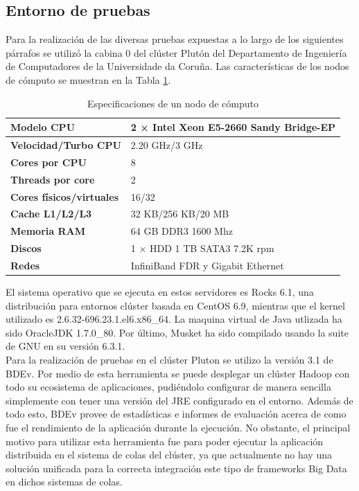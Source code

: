 \documentclass[conference]{IEEEtran}
\begin{document}
\subsection{Entorno de pruebas}
Para la realización de las diversas pruebas expuestas a lo largo de los siguientes párrafos se utilizó la cabina 0 del clúster Plutón\cite{pluton} del Departamento de Ingeniería de Computadores de la Universidade da Coruña. Las características de los nodos de cómputo se muestran en la Tabla \ref{node_especification}.\\ 

\begin{table}[t]
	\begin{center}
		\begin{tabular}{|l|l|}
			\hline
			\textbf{Modelo CPU} & 2 × Intel Xeon E5-2660 Sandy Bridge-EP \\ \hline
			\textbf{Velocidad/Turbo CPU} & 2.20 GHz/3 GHz \\ \hline
			\textbf{Cores por CPU} & 8 \\ \hline
			\textbf{Threads por core} & 2 \\ \hline
			\textbf{Cores físicos/virtuales} & 16/32 \\ \hline
			\textbf{Cache L1/L2/L3} & 32 KB/256 KB/20 MB \\ \hline
			\textbf{Memoria RAM} & 64 GB DDR3 1600 Mhz \\ \hline
			\textbf{Discos} & 1 × HDD 1 TB SATA3 7.2K rpm\\ \hline
			\textbf{Redes} & InfiniBand FDR y Gigabit Ethernet \\ \hline
		\end{tabular}
		\caption{Especificaciones de un nodo de cómputo}
		\label{node_especification}
	\end{center}
\end{table}

El sistema operativo que se ejecuta en estos servidores es Rocks 6.1, una distribución para entornos clúster basada en CentOS 6.9, mientras que el kernel utilizado es 2.6.32-696.23.1.el6.x86\_64. La maquina virtual de Java utlizada ha sido OracleJDK 1.7.0\_80. Por último, Musket ha sido compilado usando la suite de GNU en su versión 6.3.1.\\

Para la realización de pruebas en el clúster Pluton se utilizo la versión 3.1 de BDEv\cite{bdev}. Por medio de esta herramienta se puede desplegar un clúster Hadoop con todo su ecosistema de aplicaciones, pudiéndolo configurar de manera sencilla simplemente con tener una versión del JRE configurado en el entorno. Además de todo esto, BDEv provee de estadísticas e informes de evaluación acerca de como fue el rendimiento de la aplicación durante la ejecución. No obstante, el principal motivo para utilizar esta herramienta fue para poder ejecutar la aplicación distribuida en el sistema de colas del clúster, ya que actualmente no hay una solución unificada para la correcta integración este tipo de frameworks Big Data en dichos sistemas de colas.\\
\end{document}
